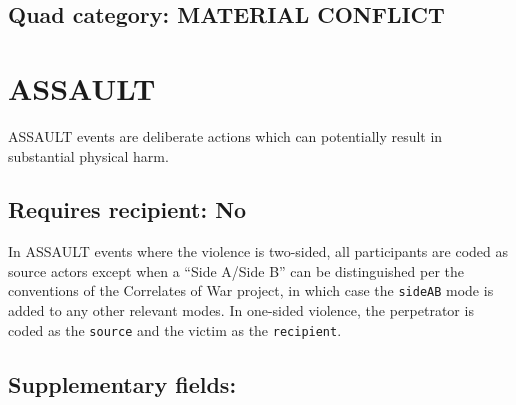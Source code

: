 \documentclass[11pt]{report}
\newcommand{\plcat}[1]{\textsf{#1}}
\newcommand{\plmod}[1]{\texttt{#1}}
\begin{document}
 
\subsection{Quad category: MATERIAL CONFLICT}

\newpage  


\section{ASSAULT}

\plcat{ASSAULT} events are deliberate actions which can potentially result in substantial physical harm.

\subsection{Requires recipient: No}

In \plcat{ASSAULT} events where the violence is two-sided, all participants are coded as source actors except when a ``Side A/Side B'' can be distinguished per the conventions of the Correlates of War project, in which case the \plmod{sideAB} mode is added to any other relevant modes. In one-sided violence, the perpetrator is coded as the \texttt{source} and the victim as the \texttt{recipient}.

\subsection{Supplementary fields:}
\end{document}
